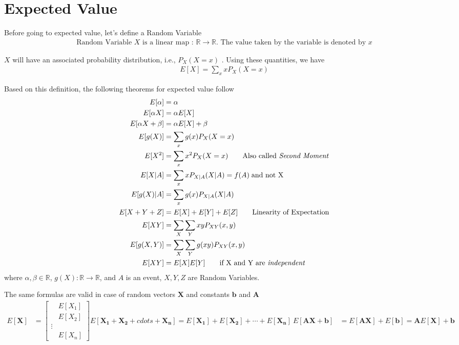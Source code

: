 \documentclass[../probability-notes.tex]{subfiles}
\begin{document}
    \section{Expected Value}
    Before going to expected value, let's define a Random Variable
    \begin{align*}
        \text{Random Variable } X \text{ is a linear map : } \mathbb{R} \to \mathbb{R} \text{. The value taken by the variable is denoted by } x
    \end{align*}
    
    $X$ will have an associated probability distribution, i.e., $P_{X}(X = x)$ . Using these quantities, we have
    \begin{align*}
        E[X] = \sum_x xP_{X}(X = x) \tag*{Expected Value}
    \end{align*}

    Based on this definition, the following theorems for expected value follow
    \begin{align*}
        E[\alpha] &= \alpha\\
        E[\alpha X] &= \alpha E[X] \\
        E[\alpha X + \beta] &= \alpha E[X] + \beta \\
        E[g(X)] &= \sum_x g(x)P_{X}(X = x) \\
        E[X^{2}] &= \sum_x x^{2} P_{X}(X = x) \tag*{Also called \emph{Second Moment}}\\
        E[X|A] &= \sum_{x} x P_{X|A}(X|A) = f(A)\;\text{and not X}\\
        E[g(X)|A] &= \sum_{x} g(x) P_{X|A}(X|A) \\
        E[X + Y + Z] &= E[X] + E[Y] + E[Z] \tag*{Linearity of Expectation}\\
        E[XY] &= \sum_{X} \sum_{Y} xy P_{XY}(x,y) \\
        E[g(X,Y)] &= \sum_{X} \sum_{Y} g(xy) P_{XY}(x,y) \\
        E[XY] &= E[X]E[Y] \tag*{if X and Y are \emph{independent}}
    \end{align*}
    where $\alpha, \beta \in \mathbb{R}$, $g(X) : \mathbb{R} \rightarrow \mathbb{R}$, and $A$ is an event, $X, Y, Z$ are Random Variables.\newline

    The same formulas are valid in case of random vectors $\mathbf{X}$ and constants $\mathbf{b}$ and $\mathbf{A}$
    \begin{align*}
        E[\mathbf{X}] &= \begin{bmatrix}
        &E[X_{1}]\\
        &E[X_{2}]\\
        \vdots\\
        &E[X_{n}]
        \end{bmatrix}
        E[\mathbf{X_{1}} + \mathbf{X_{2}} + cdots + \mathbf{X_{n}}] = E[\mathbf{X_{1}}] + E[\mathbf{X_{2}}] + \cdots + E[\mathbf{X_{n}}]\
        E[\mathbf{A}\mathbf{X}+\mathbf{b}] &= E[\mathbf{A}\mathbf{X}] + E[\mathbf{b}] = \mathbf{A}E[\mathbf{X}] + \mathbf{b}\\
    \end{align*}
\end{document}
